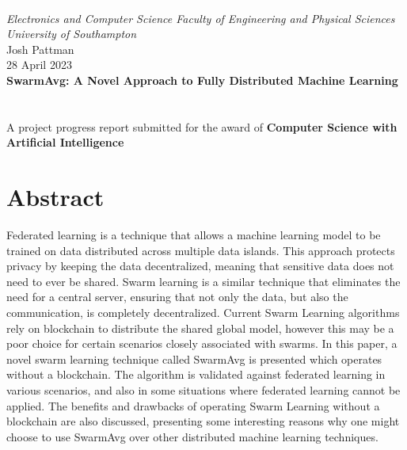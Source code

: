 \documentclass[12pt,a4paper]{report}
\author{Josh Pattman}
\begin{document}
	
	\begin{titlepage}
		\textcolor{white}{.}\\[2.2cm]
		\centering\Large\emph{Electronics and Computer Science Faculty of Engineering and Physical Sciences University of Southampton}
		\\[2cm]
		\centering\Large{Josh Pattman} \\
		\centering\Large{28 April 2023} \\
		\centering\huge\textbf{SwarmAvg: A Novel Approach to Fully Distributed Machine Learning}
		\\[2cm]
		 \\[1cm]
		\\[2cm]
		\centering\Large{A project progress report submitted for the award of \textbf{Computer Science with Artificial Intelligence}}
	\end{titlepage}
	
	\chapter*{Abstract}
	Federated learning is a technique that allows a machine learning model to be trained on data distributed across multiple data islands. This approach protects privacy by keeping the data decentralized, meaning that sensitive data does not need to ever be shared. Swarm learning is a similar technique that eliminates the need for a central server, ensuring that not only the data, but also the communication, is completely decentralized. Current Swarm Learning algorithms rely on blockchain to distribute the shared global model, however this may be a poor choice for certain scenarios closely associated with swarms. In this paper, a novel swarm learning technique called SwarmAvg is presented which operates without a blockchain. The algorithm is validated against federated learning in various scenarios, and also in some situations where federated learning cannot be applied. The benefits and drawbacks of operating Swarm Learning without a blockchain are also discussed, presenting some interesting reasons why one might choose to use SwarmAvg over other distributed machine learning techniques.
	
\end{document}
